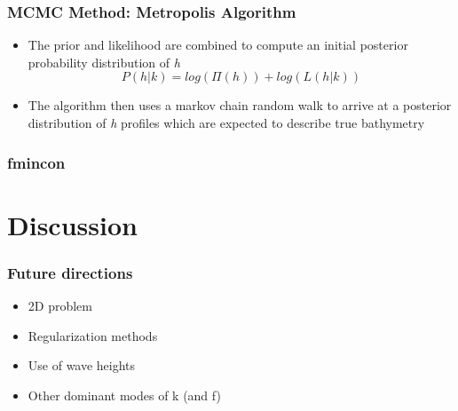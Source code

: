\documentclass[7pt]{beamer}
\begin{document}
\begin{frame}
 \frametitle{MCMC Method: Metropolis Algorithm}
\begin{itemize}
\item The prior and likelihood are combined to compute an initial posterior probability distribution of \textit{h}\\
\begin{equation}\label{post}
P(h|%
k) = log(\Pi(h)) + log(L(h|%
k))
\end{equation}
\item The algorithm then uses a markov chain random walk to %
arrive at a posterior distribution of \textit{h} profiles which are expected to describe true bathymetry
\end{itemize}
\end{frame}


 \begin{frame}
\frametitle{fmincon}


\end{frame}





\section{Discussion}
\begin{frame}
 \frametitle{Future directions}
 \begin{itemize}
 \item 2D problem
 \item Regularization methods
 \item Use of wave heights
 \item Other dominant modes of k (and f)
 \end{itemize}

\end{frame}
\end{document}
